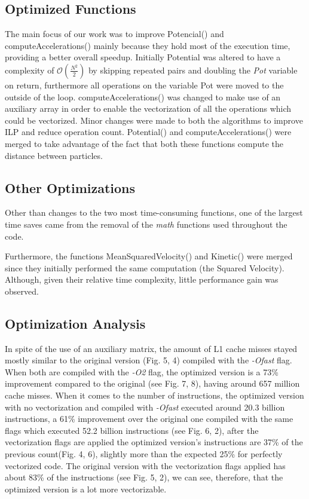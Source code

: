 \documentclass[conference]{IEEEtran}
\begin{document}
\subsection{Optimized Functions}
The main focus of our work was to improve Potencial() and computeAccelerations() mainly because they hold most of the execution time, providing a better overall speedup. Initially Potential was altered to have a complexity of $\mathcal{O}(\frac{N^2}{2})$ by skipping repeated pairs and doubling the \textit{Pot} variable on return, furthermore all operations on the variable Pot were moved to the outside of the loop. computeAccelerations() was changed to make use of an auxiliary array in order to enable the vectorization of all the operations which could be vectorized. Minor changes were made to both the algorithms to improve ILP and reduce operation count. Potential() and computeAccelerations() were merged to take advantage of the fact that both these functions compute the distance between particles.

\subsection{Other Optimizations}
Other than changes to the two most time-consuming functions, one of the largest time saves came from the removal of the \textit{math} functions used throughout the code.

Furthermore, the functions MeanSquaredVelocity() and Kinetic() were merged since they initially performed the same computation (the Squared Velocity). Although, given their relative time complexity, little performance gain was observed.

\subsection{Optimization Analysis}
In spite of the use of an auxiliary matrix, the amount of L1 cache misses stayed mostly similar to the original version (Fig. 5, 4) compiled with the \textit{-Ofast} flag. When both are compiled with the \textit{-O2} flag, the optimized version is a 73\% improvement compared to the original (see Fig. 7, 8), having around 657 million cache misses.
When it comes to the number of instructions, the optimized version with no vectorization and compiled with \textit{-Ofast} executed around 20.3 billion instructions, a 61\% improvement over the original one compiled with the same flags which executed 52.2 billion instructions (see Fig. 6, 2), after the vectorization flags are applied the optimized version's instructions are 37\% of the previous count(Fig. 4, 6), slightly more than the expected 25\% for perfectly vectorized code. The original version with the vectorization flags applied has about 83\% of the instructions (see Fig. 5, 2), we can see, therefore, that the optimized version is a lot more vectorizable.
\end{document}
